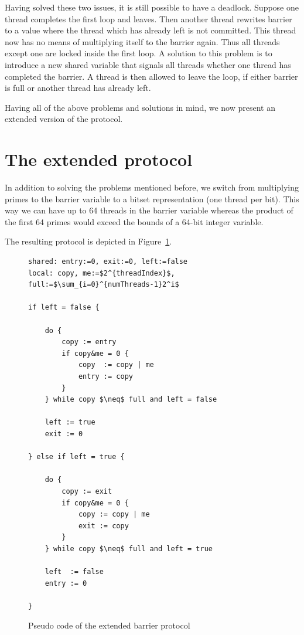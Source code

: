 \documentclass[a4paper, 10pt]{article}
\begin{document}
Having solved these two issues, it is still possible to have a deadlock. Suppose one thread completes the first loop and leaves. Then another thread rewrites barrier to a value where the thread which has already left is not committed. This thread now has no means of multiplying itself to the barrier again. Thus all threads except one are locked inside the first loop. A solution to this problem is to introduce a new shared variable that signals all threads whether one thread has completed the barrier. A thread is then allowed to leave the loop, if either barrier is full or another thread has already left.

Having all of the above problems and solutions in mind, we now present an extended version of the protocol.

\section{The extended protocol}
In addition to solving the problems mentioned before, we switch from multiplying primes to the barrier variable to a bitset representation (one thread per bit). This way we can have up to 64 threads in the barrier variable whereas the product of the first 64 primes would  exceed the bounds of a 64-bit integer variable.

The resulting protocol is depicted in Figure~\ref{fig:barrier-source-code}.

\begin{figure}[htb]
	\centering
	\begin{lstlisting}[mathescape]
shared: entry:=0, exit:=0, left:=false
local: copy, me:=$2^{threadIndex}$, full:=$\sum_{i=0}^{numThreads-1}2^i$

if left = false {

	do {
		copy := entry
		if copy&me = 0 {
			copy  := copy | me
			entry := copy
		}
	} while copy $\neq$ full and left = false

	left := true
	exit := 0

} else if left = true {

	do {
		copy := exit
		if copy&me = 0 {
			copy := copy | me
			exit := copy
		}
	} while copy $\neq$ full and left = true

	left  := false
	entry := 0

}
	\end{lstlisting}
	\caption{Pseudo code of the extended barrier protocol}
	\label{fig:barrier-source-code}
\end{figure}
\end{document}
